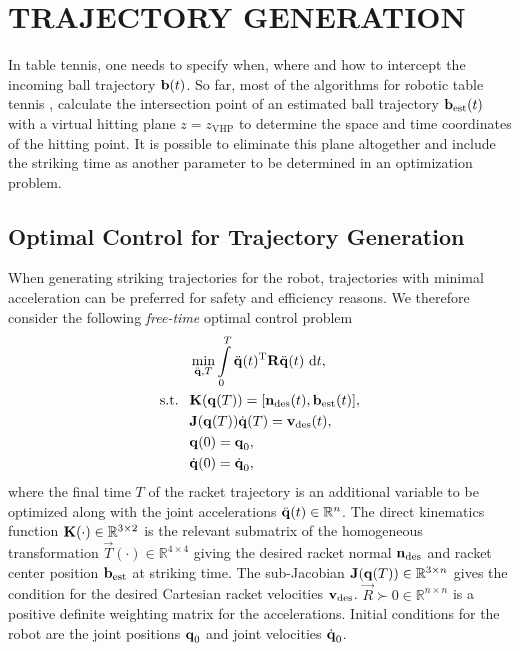\section{TRAJECTORY GENERATION}\label{method}
%
In table tennis, one needs to specify when, where and how to intercept the incoming ball trajectory $\boldsymbol{\mathrm{b}}(t)$. So far, most of the algorithms for robotic table tennis \cite{Matsushima05}, \cite{Muelling13} calculate the intersection point of an estimated ball trajectory $\boldsymbol{\mathrm{b}}_{\mathrm{est}}(t)$ with a virtual hitting plane $z = z_{\mathrm{VHP}}$ to determine the space and time coordinates of the hitting point. It is possible to eliminate this plane altogether and include the striking time as another parameter to be determined in an optimization problem.
%
\subsection{Optimal Control for Trajectory Generation}
%
When generating striking trajectories for the robot, trajectories with minimal acceleration can be preferred for safety and efficiency reasons. We therefore consider the following \emph{free-time} optimal control problem~\cite{Liberzon11}
%
\begin{align}
&\min_{\ddot{\boldsymbol{\mathrm{q}}},T} \int\limits_{0}^{T}\ddot{\boldsymbol{\mathrm{q}}}(t)^{\mathrm{T}}\boldsymbol{\mathrm{R}}\ddot{\boldsymbol{\mathrm{q}}}(t) \ \mathrm{d}t, \label{costFnc1} \\
\textrm{s.t. \ } & \boldsymbol{\mathrm{K}}(\boldsymbol{\mathrm{q}}(T)) = [\boldsymbol{\mathrm{n}}_{\mathrm{des}}(t),\boldsymbol{\mathrm{b}}_{\mathrm{est}}(t)], \label{transCond1}\\
&\boldsymbol{\mathrm{J}}(\boldsymbol{\mathrm{q}}(T))\dot{\boldsymbol{\mathrm{q}}}(T) = \boldsymbol{\mathrm{v}}_{\mathrm{des}}(t), \label{transCond2} \\
&\boldsymbol{\mathrm{q}}(0) = \boldsymbol{\mathrm{q}}_{0}, \label{initCond1} \\
&\dot{\boldsymbol{\mathrm{q}}}(0) = \dot{\boldsymbol{\mathrm{q}}}_{0}, \label{initCond2}
\end{align}
%
\noindent where the final time $T$ of the racket trajectory is an additional variable to be optimized along with the joint accelerations $\ddot{\boldsymbol{\mathrm{q}}}(t) \in \mathbb{R}^{n}$. The direct kinematics function $\boldsymbol{\mathrm{K}}(\cdot)  \in \mathbb{R}^{3 \times 2}$ is the relevant submatrix of the homogeneous transformation $\vec{T}(\cdot) \in \mathbb{R}^{4 \times 4}$ giving the desired racket normal $\boldsymbol{\mathrm{n}}_{\mathrm{des}}$ and racket center position $\boldsymbol{\mathrm{b}}_{\mathrm{est}}$ at striking time. The sub-Jacobian $\boldsymbol{\mathrm{J}}(\boldsymbol{\mathrm{q}}(T)) \in \mathbb{R}^{3 \times n}$ gives the condition for the desired Cartesian racket velocities $\boldsymbol{\mathrm{v}}_{\mathrm{des}}$. $\vec{R} \succ 0 \in \mathbb{R}^{n \times n}$ is a positive definite weighting matrix for the accelerations. Initial conditions for the robot are the joint positions $\boldsymbol{\mathrm{q}}_0$ and joint velocities $\dot{\boldsymbol{\mathrm{q}}}_0$.


